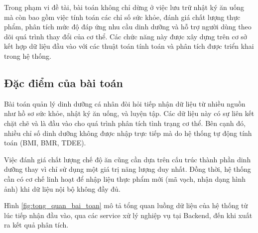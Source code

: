 \documentclass[12pt, a4paper]{report}
\begin{document}
Trong phạm vi đề tài, bài toán không chỉ dừng ở việc lưu trữ nhật ký ăn uống mà còn bao gồm việc tính toán các chỉ số sức khỏe, đánh giá chất lượng thực phẩm, phân tích mức độ đáp ứng nhu cầu dinh dưỡng và hỗ trợ người dùng theo dõi quá trình thay đổi của cơ thể. Các chức năng này được xây dựng trên cơ sở kết hợp dữ liệu đầu vào với các thuật toán tính toán và phân tích được triển khai trong hệ thống.

\subsection{Đặc điểm của bài toán}Bài toán quản lý dinh dưỡng cá nhân đòi hỏi tiếp nhận dữ liệu từ nhiều nguồn như hồ sơ sức khỏe, nhật ký ăn uống, và luyện tập. Các dữ liệu này có sự liên kết chặt chẽ và là đầu vào cho quá trình phân tích tình trạng cơ thể. Bên cạnh đó, nhiều chỉ số dinh dưỡng không được nhập trực tiếp mà do hệ thống tự động tính toán (BMI, BMR, TDEE).

Việc đánh giá chất lượng chế độ ăn cũng cần dựa trên cấu trúc thành phần dinh dưỡng thay vì chỉ sử dụng một giá trị năng lượng duy nhất. Đồng thời, hệ thống cần có cơ chế linh hoạt để nhập liệu thực phẩm mới (mã vạch, nhận dạng hình ảnh) khi dữ liệu nội bộ không đầy đủ.

Hình \ref{fig:tong_quan_bai_toan} mô tả tổng quan luồng dữ liệu của hệ thống từ lúc tiếp nhận đầu vào, qua các service xử lý nghiệp vụ tại Backend, đến khi xuất ra kết quả phân tích.
\end{document}
